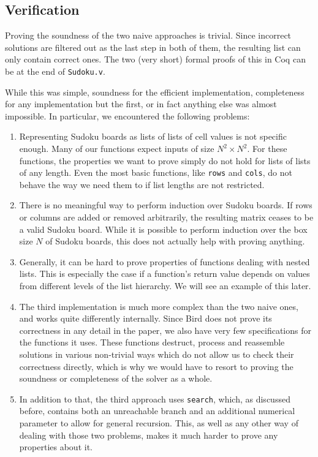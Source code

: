 \documentclass[a4paper,11pt]{article}
\begin{document}
\subsection{Verification}
Proving the soundness of the two naive approaches is trivial. Since incorrect solutions are filtered out as the last step in both of them, the resulting list can only contain correct ones. The two (very short) formal proofs of this in Coq can be  at the end of \texttt{Sudoku.v}.

While this was simple, soundness for the efficient implementation, completeness for any implementation but the first, or in fact anything else was almost impossible. In particular, we encountered the following problems:
\begin{enumerate}
  \item Representing Sudoku boards as lists of lists of cell values is not specific enough. Many of our functions expect inputs of size \(N^2 \times N^2\). For these functions, the properties we want to prove simply do not hold for lists of lists of any length. Even the most basic functions, like \texttt{rows} and \texttt{cols}, do not behave the way we need them to if list lengths are not restricted.
  \item There is no meaningful way to perform induction over Sudoku boards. If rows or columns are added or removed arbitrarily, the resulting matrix ceases to be a valid Sudoku board. While it is possible to perform induction over the box size $N$ of Sudoku boards, this does not actually help with proving anything.
  \item Generally, it can be hard to prove properties of functions dealing with nested lists. This is especially the case if a function's return value depends on values from different levels of the list hierarchy. We will see an example of this later.
  \item The third implementation is much more complex than the two naive ones, and works quite differently internally. Since Bird does not prove its correctness in any detail in the paper, we also have very few specifications for the functions it uses. These functions destruct, process and reassemble solutions in various non-trivial ways which do not allow us to check their correctness directly, which is why we would have to resort to proving the soundness or completeness of the solver as a whole.
  \item In addition to that, the third approach uses \texttt{search}, which, as discussed before, contains both an unreachable branch and an additional numerical parameter to allow for general recursion. This, as well as any other way of dealing with those two problems, makes it much harder to prove any properties about it.
\end{enumerate}
\end{document}
